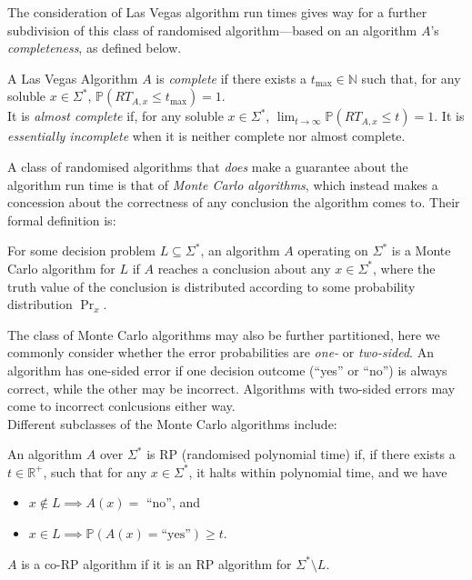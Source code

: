 	The consideration of Las Vegas algorithm run times gives way for a further subdivision of 
	this class of randomised algorithm---based on an algorithm $A$'s \emph{completeness}, as 
	defined below.
	\begin{definition}
		A Las Vegas Algorithm $A$ is \emph{complete} if there exists a $t_\mathrm{max} 
		\in \mathbb{N}$ such that, for any soluble $x \in \Sigma^*$, $\mathbb{P}(RT_{A,x} 
		\leq t_\mathrm{max}) = 1$.\\
		It is \emph{almost complete} if, for any soluble $x \in \Sigma^*$, $\lim_{t
		\rightarrow\infty}\mathbb{P}(RT_{A, x} \leq t) = 1$. It is \emph{essentially 
		incomplete} when it is neither complete nor almost complete.
	\end{definition}
	\par
	A class of randomised algorithms that \emph{does} make a guarantee about the algorithm 
	run time is that of \emph{Monte Carlo algorithms}, which instead makes a concession about 
	the correctness of any conclusion the algorithm comes to. Their formal definition is:
	\begin{definition}
		For some decision problem $L \subseteq \Sigma^*$, an algorithm $A$ operating on
		$\Sigma^*$ is a Monte Carlo algorithm for $L$ if $A$ reaches a conclusion about
		any $x \in \Sigma^*$, where the truth value of the conclusion is distributed 
		according to some probability distribution $\Pr_x$.
	\end{definition}
	The class of Monte Carlo algorithms may also be further partitioned, here we commonly 
	consider whether the error probabilities are \emph{one-} or \emph{two-sided}. 
	An algorithm has one-sided error if one decision outcome (``yes'' or ``no'') is always 
	correct, while the other may be incorrect. Algorithms with two-sided errors may 
	come to incorrect conlcusions either way. \\
	Different subclasses of the Monte Carlo algorithms include:
	\begin{definition}
		An algorithm $A$ over $\Sigma^*$ is RP (randomised polynomial time) if, if there 
		exists a $t \in \mathbb{R}^+$, such that for any $x \in \Sigma^*$, it halts 
		within polynomial time, and we have
		\begin{itemize}
			\item $x \notin L \implies A(x) =$ ``no'', and
			\item $x \in L \implies \mathbb{P}(A(x) = \text{``yes''}) \geq t$.
		\end{itemize}

		$A$ is a co-RP algorithm if it is an RP algorithm for $\Sigma^* \setminus L$.
	\end{definition}
